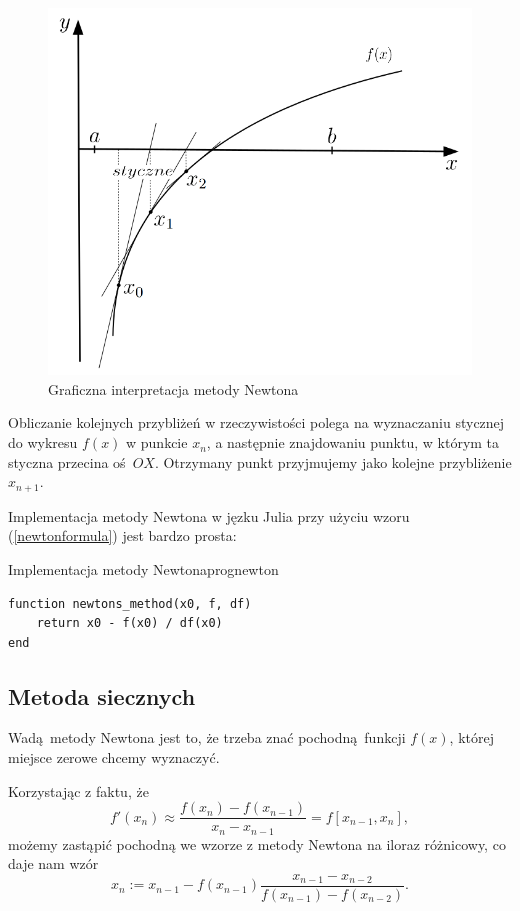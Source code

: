 \documentclass[12pt]{article}
\begin{document}
\begin{figure}[H]
    \centering
    \includegraphics[scale=0.7]{plot_newton.png}
\caption{Graficzna interpretacja metody Newtona}
\label{figure:fig1}
\end{figure}

Obliczanie kolejnych przybliżeń w rzeczywistości polega na wyznaczaniu stycznej
do wykresu $f(x)$ w punkcie $x_n$, a następnie znajdowaniu punktu, w którym ta
styczna przecina oś $OX$. Otrzymany punkt przyjmujemy jako kolejne przybliżenie
$x_{n+1}$.\newpage

Implementacja metody Newtona w jęzku Julia przy użyciu wzoru 
(\ref{newtonformula}) jest bardzo prosta:

\begin{prog}{Implementacja metody Newtona}{prognewton}
\begin{lstlisting}
function newtons_method(x0, f, df)
    return x0 - f(x0) / df(x0)
end
\end{lstlisting}
\end{prog}

\subsection{Metoda siecznych \cite{kincaid}}

Wadą metody Newtona jest to, że trzeba znać pochodną funkcji $f(x)$, której
miejsce zerowe chcemy wyznaczyć.

Korzystając z faktu, że
\[f'(x_n) \approx \frac{f(x_n)-f(x_{n-1})}{x_n - x_{n-1}} = f[x_{n-1}, x_n],\]
możemy zastąpić pochodną we wzorze z metody Newtona na iloraz różnicowy, co daje
nam wzór
\[x_n:=x_{n-1} - f(x_{n-1})\frac{x_{n-1} - x_{n-2}}{f(x_{n-1}) - f(x_{n-2})}.\]
\end{document}
